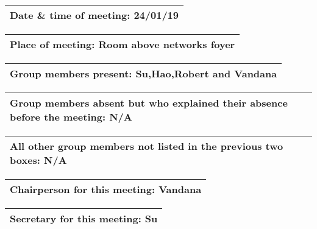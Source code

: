 \documentclass{article}
\begin{document}
\begin{table}[H]
	\centering
	\begin{tabular}{| p{12cm}  |}
	\hline
	Date \& time of meeting: 24/01/19 \\ \hline
\end{tabular}
\end{table}

\begin{table}[H]
	\centering
	\begin{tabular}{| p{12cm}  |}
	\hline
	Place of meeting: Room above networks foyer\\ \hline
\end{tabular}
\end{table}

\begin{table}[H]
	\centering
	\begin{tabular}{| p{12cm}  |}
	\hline
	Group members present: Su,Hao,Robert and Vandana\\ \hline
\end{tabular}
\end{table}

\begin{table}[H]
	\centering
	\begin{tabular}{| p{12cm}  |}
	\hline
	Group members absent but who explained their absence before the meeting: N/A\\ \hline
\end{tabular}
\end{table}

\begin{table}[H]
	\centering
	\begin{tabular}{| p{12cm}  |}
	\hline
	All other group members not listed in the previous two boxes: N/A\\ \hline
\end{tabular}
\end{table}

\begin{table}[H]
	\centering
	\begin{tabular}{| p{12cm}  |}
	\hline
	Chairperson for this meeting: Vandana\\ \hline
\end{tabular}
\end{table}

\begin{table}[H]
	\centering
	\begin{tabular}{| p{12cm}  |}
	\hline
	Secretary for this meeting:  Su\\ \hline
\end{tabular}
\end{table}
\end{document}
